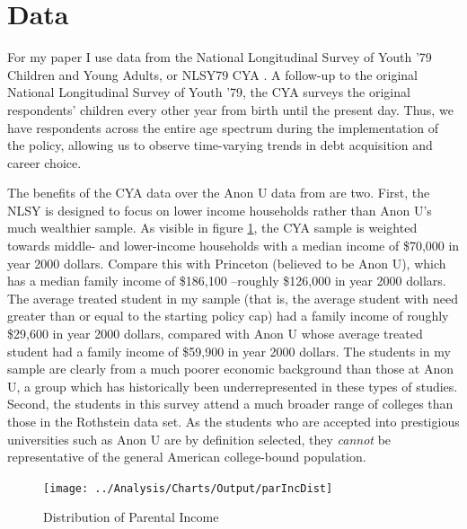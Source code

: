 \documentclass[12pt]{article}
\begin{document}
	
	
	\section{Data}
	
	For my paper I use data from the National Longitudinal Survey of Youth '79 Children and Young Adults, or NLSY79 CYA \parencite{bls2018}. A follow-up to the original National Longitudinal Survey of Youth '79, the CYA surveys the original respondents' children every other year from birth until the present day. Thus, we have respondents across the entire age spectrum during the implementation of the policy, allowing us to observe time-varying trends in debt acquisition and career choice. 
	
	The benefits of the CYA data over the Anon U data from \textcite{rothstein2011} are two. First, the NLSY is designed to focus on lower income households rather than Anon U's much wealthier sample. As visible in figure \ref{incDist}, the CYA sample is weighted towards middle- and lower-income households with a median income of \$70,000 in year 2000 dollars. Compare this with Princeton (believed to be Anon U), which has a median family income of \$186,100 \parencite{aisch2017}--roughly \$126,000 in year 2000 dollars. The average treated student in my sample (that is, the average student with need greater than or equal to the starting policy cap) had a family income of roughly \$29,600 in year 2000 dollars, compared with Anon U whose average treated student had a family income of \$59,900 in year 2000 dollars. The students in my sample are clearly from a much poorer economic background than those at Anon U, a group which has historically been underrepresented in these types of studies. Second, the students in this survey attend a much broader range of colleges than those in the Rothstein data set. As the students who are accepted into prestigious universities such as Anon U are by definition selected, they \emph{cannot} be representative of the general American college-bound population. 
	
	\begin{figure}
		\centering
		\caption{Distribution of Parental Income}
		\label{incDist}
		\texttt{[image: ../Analysis/Charts/Output/parIncDist]}
	\end{figure}
	
\end{document}
